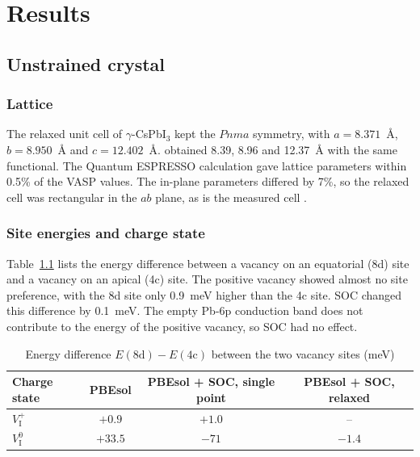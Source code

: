 
\chapter{Results}
\label{ch:results}

\section{Unstrained crystal}
\label{sec:res-unstrained}

\subsection{Lattice}

The relaxed unit cell of $\gamma$-CsPbI$_3$ kept the $Pnma$ symmetry, with $a = 8.371$~\AA, $b = 8.950$~\AA{} and $c = 12.402$~\AA. \citet{Zhang2025} obtained 8.39, 8.96 and 12.37~\AA{} with the same functional. The Quantum ESPRESSO calculation gave lattice parameters within 0.5\% of the VASP values. The in-plane parameters differed by 7\%, so the relaxed cell was rectangular in the $ab$ plane, as is the measured cell \citep{Sutton2018}.

\subsection{Site energies and charge state}

Table~\ref{tab:sites} lists the energy difference between a vacancy on an equatorial (8d) site and a vacancy on an apical (4c) site. The positive vacancy showed almost no site preference, with the 8d site only 0.9~meV higher than the 4c site. SOC changed this difference by 0.1~meV. The empty Pb-6p conduction band does not contribute to the energy of the positive vacancy, so SOC had no effect.

\begin{table}[htbp]
  \centering
  \caption{Energy difference $E(\mathrm{8d}) - E(\mathrm{4c})$ between the two vacancy sites (meV)}
  \label{tab:sites}
  \begin{tabular}{lccc}
    \toprule
    Charge state & PBEsol & PBEsol + SOC, single point & PBEsol + SOC, relaxed \\
    \midrule
    $V_\mathrm{I}^{+}$ & $+0.9$ & $+1.0$ & -- \\
    $V_\mathrm{I}^{0}$ & $+33.5$ & $-71$ & $-1.4$ \\
    \bottomrule
  \end{tabular}
\end{table}

